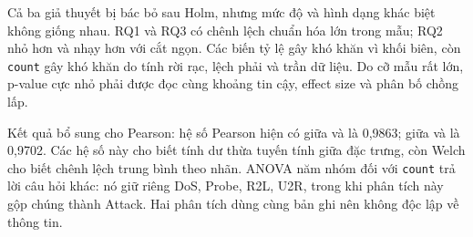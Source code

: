 \documentclass[../main.tex]{subfiles}
\begin{document}
Cả ba giả thuyết bị bác bỏ sau Holm, nhưng mức độ và hình dạng khác biệt không giống
nhau. RQ1 và RQ3 có chênh lệch chuẩn hóa lớn trong mẫu; RQ2 nhỏ hơn và nhạy hơn với
cắt ngọn. Các biến tỷ lệ gây khó khăn vì khối biên, còn \texttt{count} gây khó khăn
do tính rời rạc, lệch phải và trần dữ liệu. Do cỡ mẫu rất lớn, p-value cực nhỏ phải
được đọc cùng khoảng tin cậy, effect size và phân bố chồng lấp.

Kết quả bổ sung cho Pearson: hệ số Pearson hiện có giữa
 và  là 0,9863; giữa
 và  là 0,9702.
Các hệ số này cho biết tính dư thừa tuyến tính giữa đặc trưng, còn Welch cho biết
chênh lệch trung bình theo nhãn. ANOVA năm nhóm đối với \texttt{count} trả lời câu hỏi
khác: nó giữ riêng DoS, Probe, R2L, U2R, trong khi phân tích này gộp chúng thành Attack.
Hai phân tích dùng cùng bản ghi nên không độc lập về thông tin.

\FloatBarrier
\end{document}
